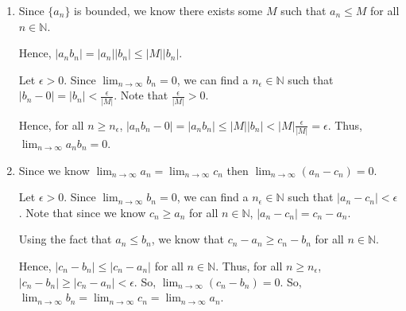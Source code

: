 \documentclass[12pt]{article}
\begin{document}
\begin{enumerate}[start=1,label={\bfseries Problem \arabic*:},leftmargin=1in]
    \item Since $\{ a_{n} \}$ is bounded, we know there exists some $M$ such that $a_{n} \leq M$ for all $n \in \mathbb{N}$. 
    
    Hence, $|a_{n}b_{n}| = |a_{n}||b_{n}| \leq |M||b_{n}|$. 

    Let $\epsilon > 0$. Since $\lim_{n \to \infty} b_{n} = 0$, we can find a $n_{\epsilon} \in \mathbb{N}$ such that $|b_{n} - 0| = |b_{n}| < \frac{\epsilon}{|M|}$. Note that $\frac{\epsilon}{|M|} > 0$. 

    Hence, for all $n \geq n_{\epsilon}$, $|a_{n}b_{n} - 0| = |a_{n}b_{n}| \leq |M||b_{n}| < |M|\frac{\epsilon}{|M|} = \epsilon$. Thus, $\lim_{n \to \infty} a_{n}b_{n} = 0$.

    \item Since we know $\lim_{n \to \infty} a_{n} = \lim_{n \to \infty} c_{n}$ then $\lim_{n \to \infty}(a_{n} - c_{n}) = 0$.
    
    Let $\epsilon > 0$. Since $\lim_{n \to \infty} b_{n} = 0$, we can find a $n_{\epsilon} \in \mathbb{N}$ such that $\left|  a_{n} - c_{n} \right| < \epsilon$. 
    Note that since we know $c_{n} \geq a_{n}$ for all $n \in \mathbb{N}$, $\left| a_{n} - c_{n} \right| = c_{n} - a_{n}$. 

    Using the fact that $a_{n} \leq b_{n}$, we know that $c_{n} - a_{n} \geq c_{n} - b_{n}$ for all $n \in \mathbb{N}$. 

    Hence, $|c_{n} - b_{n}| \leq |c_{n} - a_{n}|$ for all $n \in \mathbb{N}$. Thus, for all $n \geq n_{\epsilon}$, $|c_{n} - b_{n}| \geq |c_{n} - a_{n}| < \epsilon$. 
    So, $\lim_{n \to \infty} (c_{n} - b_{n}) = 0$. So, $\lim_{n \to \infty} b_{n} = \lim_{n \to \infty} c_{n} = \lim_{n \to \infty} a_{n}$.


\end{enumerate}
\end{document}
